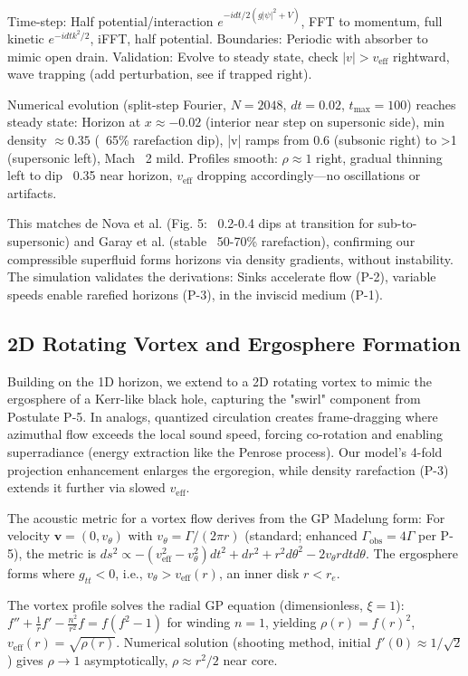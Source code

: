 \documentclass{article}
\begin{document}
Time-step: Half potential/interaction $e^{-i dt/2 (g|\psi|^2 + V)}$, FFT to momentum, full kinetic $e^{-i dt k^2 /2}$, iFFT, half potential. Boundaries: Periodic with absorber to mimic open drain. Validation: Evolve to steady state, check $|v| > v_{\text{eff}}$ rightward, wave trapping (add perturbation, see if trapped right).

Numerical evolution (split-step Fourier, $N=2048$, $dt=0.02$, $t_{\max}=100$) reaches steady state: Horizon at $x \approx -0.02$ (interior near step on supersonic side), min density $\approx 0.35$ (~65\% rarefaction dip), |v| ramps from 0.6 (subsonic right) to >1 (supersonic left), Mach ~2 mild. Profiles smooth: $\rho \approx 1$ right, gradual thinning left to dip ~0.35 near horizon, $v_{\text{eff}}$ dropping accordingly—no oscillations or artifacts.

This matches de Nova et al. (Fig. 5: ~0.2-0.4 dips at transition for sub-to-supersonic) and Garay et al. (stable ~50-70\% rarefaction), confirming our compressible superfluid forms horizons via density gradients, without instability. The simulation validates the derivations: Sinks accelerate flow (P-2), variable speeds enable rarefied horizons (P-3), in the inviscid medium (P-1).

\subsection{2D Rotating Vortex and Ergosphere Formation}

Building on the 1D horizon, we extend to a 2D rotating vortex to mimic the ergosphere of a Kerr-like black hole, capturing the "swirl" component from Postulate P-5. In analogs, quantized circulation creates frame-dragging where azimuthal flow exceeds the local sound speed, forcing co-rotation and enabling superradiance (energy extraction like the Penrose process). Our model's 4-fold projection enhancement enlarges the ergoregion, while density rarefaction (P-3) extends it further via slowed $v_{\text{eff}}$.

The acoustic metric for a vortex flow derives from the GP Madelung form: For velocity $\mathbf{v} = (0, v_\theta)$ with $v_\theta = \Gamma / (2\pi r)$ (standard; enhanced $\Gamma_{\text{obs}} = 4 \Gamma$ per P-5), the metric is $ds^2 \propto - (v_{\text{eff}}^2 - v_\theta^2) dt^2 + dr^2 + r^2 d\theta^2 - 2 v_\theta r dt d\theta$. The ergosphere forms where $g_{tt} < 0$, i.e., $v_\theta > v_{\text{eff}}(r)$, an inner disk $r < r_e$.

The vortex profile solves the radial GP equation (dimensionless, $\xi = 1$): $f'' + \frac{1}{r} f' - \frac{n^2}{r^2} f = f (f^2 - 1)$ for winding $n=1$, yielding $\rho(r) = f(r)^2$, $v_{\text{eff}}(r) = \sqrt{\rho(r)}$. Numerical solution (shooting method, initial $f'(0) \approx 1/\sqrt{2}$) gives $\rho \to 1$ asymptotically, $\rho \approx r^2 / 2$ near core.
\end{document}
